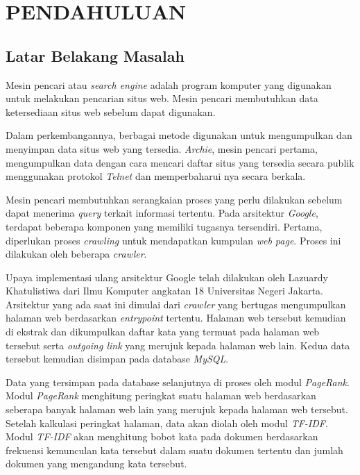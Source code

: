 
\chapter{PENDAHULUAN}

\section{Latar Belakang Masalah }

Mesin pencari atau \emph{search engine} adalah program komputer yang digunakan 
untuk melakukan pencarian situs web. Mesin pencari membutuhkan data ketersediaan
situs web sebelum dapat digunakan.

Dalam perkembangannya, berbagai metode digunakan untuk mengumpulkan dan
menyimpan data situs web yang tersedia. \emph{Archie}, mesin pencari pertama, 
mengumpulkan data dengan cara mencari daftar situs yang tersedia secara publik
menggunakan protokol \emph{Telnet} dan memperbaharui nya secara berkala.

Mesin pencari membutuhkan serangkaian proses yang perlu dilakukan sebelum dapat
menerima \emph{query} terkait informasi tertentu. Pada arsitektur \emph{Google},
terdapat beberapa komponen yang memiliki tugasnya tersendiri. Pertama,
diperlukan proses \emph{crawling} untuk mendapatkan kumpulan \emph{web page}.
Proses ini dilakukan oleh beberapa \emph{crawler}.

Upaya implementasi ulang arsitektur Google telah dilakukan oleh Lazuardy
Khatulistiwa dari Ilmu Komputer angkatan 18 Universitas Negeri Jakarta.
Arsitektur yang ada saat ini dimulai dari \emph{crawler} yang bertugas
mengumpulkan halaman web berdasarkan \emph{entrypoint} tertentu. Halaman web
tersebut kemudian di ekstrak dan dikumpulkan daftar kata yang termuat pada
halaman web tersebut serta \emph{outgoing link} yang merujuk kepada halaman web
lain. Kedua data tersebut kemudian disimpan pada database	\emph{MySQL}.

Data yang tersimpan pada database selanjutnya di proses oleh modul
\emph{PageRank}. Modul \emph{PageRank} menghitung peringkat suatu halaman web
berdasarkan seberapa banyak halaman web lain yang merujuk kepada halaman web
tersebut. Setelah kalkulasi peringkat halaman, data akan diolah oleh modul
\emph{TF-IDF}. Modul \emph{TF-IDF} akan menghitung bobot kata pada dokumen
berdasarkan frekuensi kemunculan kata tersebut dalam suatu dokumen tertentu dan
jumlah dokumen yang mengandung kata tersebut.

